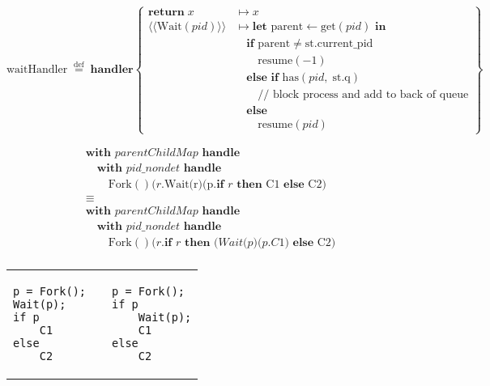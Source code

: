 \documentclass[logo,bsc,singlespacing,parskip]{infthesis}
\begin{document}
\[
\mathrm{waitHandler} \;\overset{\mathrm{def}}{=}\; \textbf{handler}
\left\{
\begin{array}{ll}
\mathbf{return}\; x 
  & \mapsto x \\[1ex]

\langle\!\langle \mathrm{Wait}(pid) \rangle\!\rangle 
  & \mapsto \textbf{let } \mathrm{parent} \leftarrow \mathrm{get}(pid) \textbf{ in} \\
  & \quad \textbf{if } \mathrm{parent} \neq \mathrm{st.current\_pid} \\ & \quad\quad  \mathrm{resume}(-1) \\[0.5ex]
  & \quad \textbf{else if } \mathrm{has}(pid,\; \mathrm{st.q})  \\
  & \quad\quad \text{// block process and add to back of queue} \\
  & \quad \textbf{else } \\ & \quad\quad \mathrm{resume}(pid)
\end{array}
\right\}
\]



\[
\begin{array}{l}
\textbf{with } \mathit{parentChildMap} \textbf{ handle } \\
\quad\textbf{with } \mathit{pid\_nondet} \textbf{ handle } \\
\quad\quad \text{Fork}()(r. \text{Wait(r)(p.} \textbf{if } r  \textbf{ then } \text{C1} \textbf{ else } \text{C2)} \\[5pt]
\equiv \\
\textbf{with } \mathit{parentChildMap} \textbf{ handle } \\
\quad\textbf{with } \mathit{pid\_nondet} \textbf{ handle } \\\quad\quad \text{Fork}()(r. \textbf{if } r 
\textbf{ then } (\textit{Wait(p)(p.C1)} \textbf{ else } \text{C2)} \\[5pt]

\end{array}
\]




\vspace{-2em}
\begin{table}[H]
\centering
\begin{tabular}{p{} c p{}}
\begin{lstlisting}
p = Fork();
Wait(p);
if p
    C1
else
    C2
\end{lstlisting}
&
&
\begin{lstlisting}
p = Fork();
if p
    Wait(p);
    C1
else
    C2
\end{lstlisting}
\end{tabular}
\end{table}
\vspace{-2em}
\end{document}
